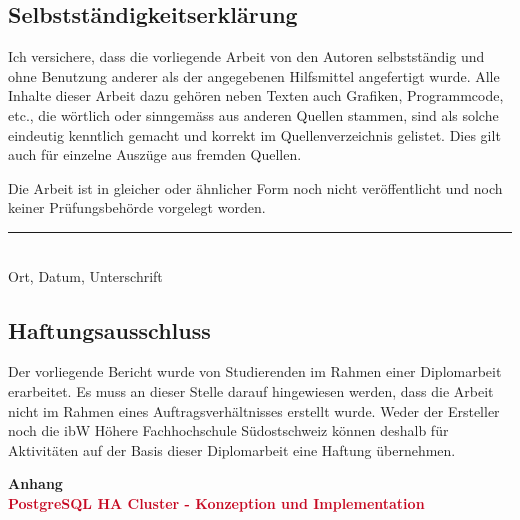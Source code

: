 \begin{appendix}


        \begin{flushleft}
        \chapter*{Selbstständigkeitserklärung}
        Ich versichere, dass die vorliegende Arbeit von den Autoren selbstständig und ohne Benutzung anderer als der angegebenen Hilfsmittel angefertigt wurde.
        Alle Inhalte dieser Arbeit dazu gehören neben Texten auch Grafiken, Programmcode, etc.,
        die wörtlich oder sinngemäss aus anderen Quellen stammen, sind als solche eindeutig kenntlich gemacht und korrekt im Quellenverzeichnis gelistet.
        Dies gilt auch für einzelne Auszüge aus fremden Quellen.
        \end{flushleft}
        \begin{flushleft}
        Die Arbeit ist in gleicher oder ähnlicher Form noch nicht veröffentlicht und noch keiner Prüfungsbehörde vorgelegt worden.

        \vspace{4cm}
        \noindent
        \hrule \ \\[-0.5ex]
        Ort, Datum, Unterschrift
        \end{flushleft}
        \begin{flushleft}
        \chapter*{Haftungsausschluss}
        Der vorliegende Bericht wurde von Studierenden im Rahmen einer Diplomarbeit erarbeitet.
        Es muss an dieser Stelle darauf hingewiesen werden, dass die Arbeit nicht im Rahmen eines Auftragsverhältnisses erstellt wurde.
        Weder der Ersteller noch die ibW Höhere Fachhochschule Südostschweiz können deshalb für Aktivitäten auf der Basis dieser Diplomarbeit eine Haftung übernehmen.
        \end{flushleft}
\clearpage
\thispagestyle{empty}

\null\vfill
\begin{center}
\huge\textbf{Anhang} \\ \vspace{1\baselineskip}
\Huge\textcolor[HTML]{C60821}{\textbf{PostgreSQL HA Cluster - Konzeption und Implementation}}
\end{center}
\vfill\clearpage


\end{appendix}
